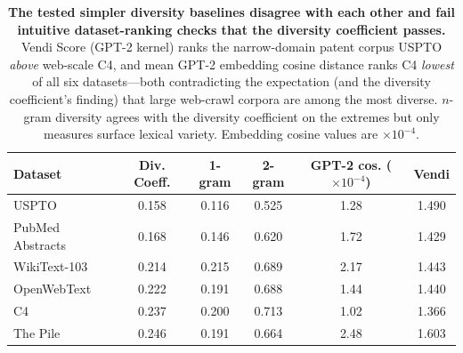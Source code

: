 \begin{table}[h!]
\centering
\caption{\textbf{The tested simpler diversity baselines disagree with each other and fail intuitive dataset-ranking checks that the diversity coefficient passes.}
Vendi Score (GPT-2 kernel) ranks the narrow-domain patent corpus USPTO \emph{above} web-scale C4, and mean GPT-2 embedding cosine distance ranks C4 \emph{lowest} of all six datasets---both contradicting the expectation (and the diversity coefficient's finding) that large web-crawl corpora are among the most diverse.
$n$-gram diversity agrees with the diversity coefficient on the extremes but only measures surface lexical variety.
Embedding cosine values are $\times 10^{-4}$.}
\vskip 0.1in
\begin{small}
\begin{tabular}{lccccc}
\toprule
Dataset & Div. Coeff. & 1-gram & 2-gram & GPT-2 cos. ($\times 10^{-4}$) & Vendi \\
\midrule
USPTO & 0.158 & 0.116 & 0.525 & 1.28 & 1.490 \\
PubMed Abstracts & 0.168 & 0.146 & 0.620 & 1.72 & 1.429 \\
WikiText-103 & 0.214 & 0.215 & 0.689 & 2.17 & 1.443 \\
OpenWebText & 0.222 & 0.191 & 0.688 & 1.44 & 1.440 \\
C4 & 0.237 & 0.200 & 0.713 & 1.02 & 1.366 \\
The Pile & 0.246 & 0.191 & 0.664 & 2.48 & 1.603 \\
\bottomrule
\end{tabular}
\end{small}
\label{tab:baseline_metrics}
\end{table}

